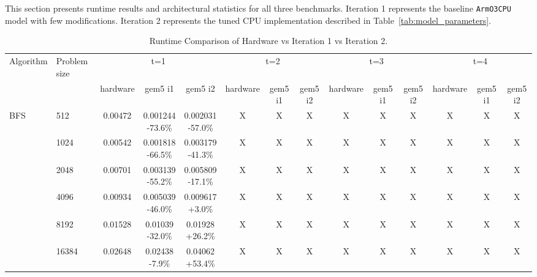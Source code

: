 \documentclass[acmlarge]{acmart}
\begin{document}
This section presents runtime results and architectural statistics for all three
benchmarks. Iteration 1 represents the baseline \texttt{ArmO3CPU} model with few
modifications. Iteration 2 represents the tuned CPU implementation described in
Table~\ref{tab:model_parameters}.




\begin{table}[htbp]
\centering
\footnotesize
\setlength{\tabcolsep}{3pt}
\renewcommand{\arraystretch}{1.04}
\caption{Runtime Comparison of Hardware vs Iteration 1 vs Iteration 2.}
\label{tab:runtime_table}
\begin{tabular}{llcccccccccccc}
\toprule
Algorithm & Problem size & \multicolumn{3}{c}{t=1} & \multicolumn{3}{c}{t=2} & \multicolumn{3}{c}{t=3} & \multicolumn{3}{c}{t=4} \\
\cmidrule(lr){3-5}\cmidrule(lr){6-8}\cmidrule(lr){9-11}\cmidrule(lr){12-14}
 & & hardware & gem5 i1 & gem5 i2 & hardware & gem5 i1 & gem5 i2 & hardware & gem5 i1 & gem5 i2 & hardware & gem5 i1 & gem5 i2 \\
\midrule
\multirow{6}{*}{BFS} & 512 & 0.00472 & \makecell{0.001244\\{\scriptsize -73.6\%}} & \makecell{0.002031\\{\scriptsize -57.0\%}} & X & X & X & X & X & X & X & X & X \\
 & 1024 & 0.00542 & \makecell{0.001818\\{\scriptsize -66.5\%}} & \makecell{0.003179\\{\scriptsize -41.3\%}} & X & X & X & X & X & X & X & X & X \\
 & 2048 & 0.00701 & \makecell{0.003139\\{\scriptsize -55.2\%}} & \makecell{0.005809\\{\scriptsize -17.1\%}} & X & X & X & X & X & X & X & X & X \\
 & 4096 & 0.00934 & \makecell{0.005039\\{\scriptsize -46.0\%}} & \makecell{0.009617\\{\scriptsize +3.0\%}} & X & X & X & X & X & X & X & X & X \\
 & 8192 & 0.01528 & \makecell{0.01039\\{\scriptsize -32.0\%}} & \makecell{0.01928\\{\scriptsize +26.2\%}} & X & X & X & X & X & X & X & X & X \\
 & 16384 & 0.02648 & \makecell{0.02438\\{\scriptsize -7.9\%}} & \makecell{0.04062\\{\scriptsize +53.4\%}} & X & X & X & X & X & X & X & X & X \\

\end{tabular}
\end{table}
\end{document}
